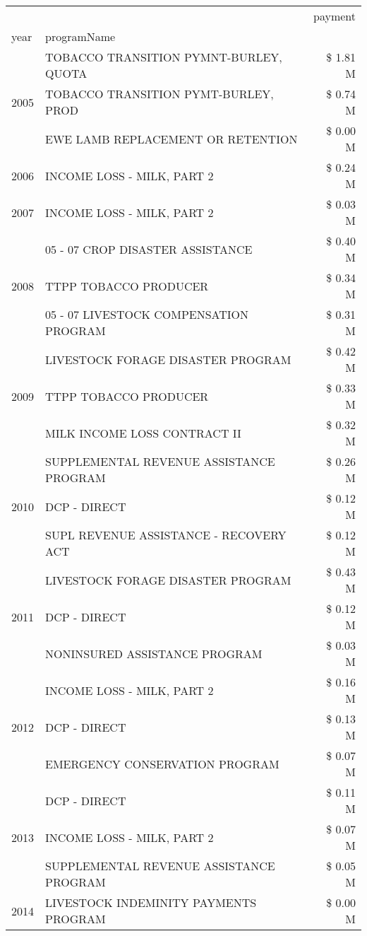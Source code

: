 \begin{tabular}{llr}
\toprule
 &  & payment \\
year & programName &  \\
\midrule
\multirow[t]{3}{*}{2005} & TOBACCO TRANSITION PYMNT-BURLEY, QUOTA & \$ 1.81 M \\
 & TOBACCO TRANSITION PYMT-BURLEY, PROD & \$ 0.74 M \\
 & EWE LAMB REPLACEMENT OR RETENTION & \$ 0.00 M \\
\cline{1-3}
2006 & INCOME LOSS - MILK, PART 2 & \$ 0.24 M \\
\cline{1-3}
2007 & INCOME LOSS - MILK, PART 2 & \$ 0.03 M \\
\cline{1-3}
\multirow[t]{3}{*}{2008} & 05 - 07 CROP DISASTER ASSISTANCE & \$ 0.40 M \\
 & TTPP TOBACCO PRODUCER & \$ 0.34 M \\
 & 05 - 07 LIVESTOCK COMPENSATION PROGRAM & \$ 0.31 M \\
\cline{1-3}
\multirow[t]{3}{*}{2009} & LIVESTOCK FORAGE DISASTER  PROGRAM & \$ 0.42 M \\
 & TTPP TOBACCO PRODUCER & \$ 0.33 M \\
 & MILK INCOME LOSS CONTRACT II & \$ 0.32 M \\
\cline{1-3}
\multirow[t]{3}{*}{2010} & SUPPLEMENTAL REVENUE ASSISTANCE PROGRAM & \$ 0.26 M \\
 & DCP - DIRECT & \$ 0.12 M \\
 & SUPL REVENUE ASSISTANCE - RECOVERY ACT & \$ 0.12 M \\
\cline{1-3}
\multirow[t]{3}{*}{2011} & LIVESTOCK FORAGE DISASTER PROGRAM & \$ 0.43 M \\
 & DCP - DIRECT & \$ 0.12 M \\
 & NONINSURED ASSISTANCE PROGRAM & \$ 0.03 M \\
\cline{1-3}
\multirow[t]{3}{*}{2012} & INCOME LOSS - MILK, PART 2 & \$ 0.16 M \\
 & DCP - DIRECT & \$ 0.13 M \\
 & EMERGENCY CONSERVATION PROGRAM & \$ 0.07 M \\
\cline{1-3}
\multirow[t]{3}{*}{2013} & DCP - DIRECT & \$ 0.11 M \\
 & INCOME LOSS - MILK, PART 2 & \$ 0.07 M \\
 & SUPPLEMENTAL REVENUE ASSISTANCE PROGRAM & \$ 0.05 M \\
\cline{1-3}
\multirow[t]{3}{*}{2014} & LIVESTOCK INDEMINITY PAYMENTS PROGRAM & \$ 0.00 M \\

\end{tabular}
